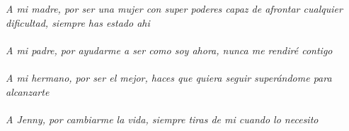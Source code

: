 \def\dedicationpage{%
\emph{%
  A mi madre, por ser una mujer con super poderes capaz de afrontar cualquier
  dificultad, siempre has estado ahi \\%
  \mbox{ }\\%
  A mi padre, por ayudarme a ser como soy ahora, nunca me rendiré contigo\\%
  \mbox{ }\\%
  A mi hermano, por ser el mejor, haces que quiera seguir superándome para alcanzarte\\%
  \mbox{ }\\%
  A Jenny, por cambiarme la vida, siempre tiras de mi cuando lo necesito\\%
}%
}

\cleardoublepage
\thispagestyle{empty}\mbox{}
\vspace*{4cm}
\begin{flushright}
\dedicationpage
\end{flushright}
\thispagestyle{empty}\mbox{}
\newpage


